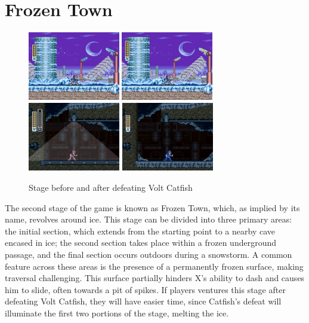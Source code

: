 \section{Frozen Town}
\begin{figure}[htp]
	\centering
	\includegraphics[height=3cm]{figures/X3/Blizzard_buffalo/Stage_1.jpg}
	\includegraphics[height=3cm]{figures/X3/Blizzard_buffalo/Stage_2.jpg}
	\includegraphics[height=3cm]{figures/X3/Blizzard_buffalo/Stage_11.jpg}
	\includegraphics[height=3cm]{figures/X3/Blizzard_buffalo/Stage_12.jpg}
	\caption{Stage before and after defeating Volt Catfish}
\end{figure}

The second stage of the game is known as Frozen Town, which, as implied by its name, revolves around ice. This stage can be divided into three primary areas: the initial section, which extends from the starting point to a nearby cave encased in ice; the second section takes place within a frozen underground passage, and the final section occurs outdoors during a snowstorm. A common feature across these areas is the presence of a permanently frozen surface, making traversal challenging. This surface partially hinders X's ability to dash and causes him to slide, often towards a pit of spikes. If players ventures this stage after defeating Volt Catfish, they will have easier time, since Catfish's defeat will illuminate the first two portions of the stage, melting the ice.

